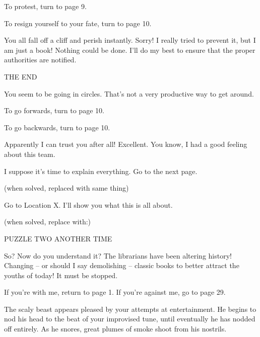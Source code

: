 \documentclass[14pt]{extbook}
\begin{document}
To protest, turn to page 9.

To resign yourself to your fate, turn to page 10.
\vspace*{\fill}
\newpage

\vspace*{\fill}
You all fall off a cliff and perish instantly. Sorry! I really tried to prevent it, but I am just a book! Nothing could be done. I’ll do my best to ensure that the proper authorities are notified.

\begin{center}
  THE END
\end{center}
\vspace*{\fill}
\newpage

\vspace*{\fill}
You seem to be going in circles. That’s not a very productive way to get around.

To go forwards, turn to page 10.

To go backwards, turn to page 10.
\vspace*{\fill}
\newpage

\vspace*{\fill}
Apparently I can trust you after all! Excellent. You know, I had a good feeling about this team.

I suppose it’s time to explain everything. Go to the next page.

(when solved, replaced with same thing)
\vspace*{\fill}
\newpage

\vspace*{\fill}
Go to Location X. I’ll show you what this is all about.

(when solved, replace with:)

PUZZLE TWO
ANOTHER TIME

So? Now do you understand it? The librarians have been altering history! Changing -- or should I say demolishing -- classic books to better attract the youths of today! It must be stopped.

If you’re with me, return to page 1.
If you’re against me, go to page 29.
\vspace*{\fill}
\newpage

\vspace*{\fill}
The scaly beast appears pleased by your attempts at entertainment. He begins to nod his head to the beat of your improvised tune, until eventually he has nodded off entirely. As he snores, great plumes of smoke shoot from his nostrils.
\end{document}
